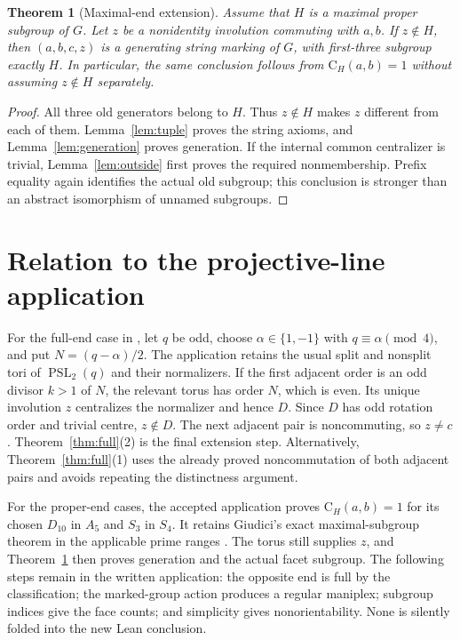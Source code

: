 \documentclass[11pt]{article}
\newtheorem{theorem}{Theorem}
\newcommand{\CG}{\mathrm C}
\begin{document}
\begin{theorem}[Maximal-end extension]\label{thm:maximal}
Assume that $H$ is a maximal proper subgroup of $G$. Let $z$ be a
nonidentity involution commuting with $a,b$. If $z\notin H$, then
$(a,b,c,z)$ is a generating string marking of $G$, with first-three
subgroup exactly $H$. In particular, the same conclusion follows from
$\CG_H(a,b)=1$ without assuming $z\notin H$ separately.
\end{theorem}
\begin{proof}
All three old generators belong to $H$. Thus $z\notin H$ makes $z$
different from each of them. Lemma~\ref{lem:tuple} proves the string
axioms, and Lemma~\ref{lem:generation} proves generation. If the internal
common centralizer is trivial, Lemma~\ref{lem:outside} first proves the
required nonmembership. Prefix equality again identifies the actual
old subgroup; this conclusion is stronger than an abstract isomorphism
of unnamed subgroups.
\end{proof}

\section{Relation to the projective-line application}
For the full-end case in \cite[Section~5]{Application}, let $q$ be odd,
choose $\alpha\in\{1,-1\}$ with $q\equiv\alpha\pmod4$, and put
$N=(q-\alpha)/2$. The application retains the usual split and nonsplit
tori of $\operatorname{PSL}_2(q)$ and their normalizers. If the first
adjacent order is an odd divisor $k>1$ of $N$, the relevant torus has
order $N$, which is even. Its unique involution $z$ centralizes the
normalizer and hence $D$. Since $D$ has odd rotation order and trivial
centre, $z\notin D$. The next adjacent pair is noncommuting, so $z\ne c$.
Theorem~\ref{thm:full}(2) is the final extension step. Alternatively,
Theorem~\ref{thm:full}(1) uses the already proved noncommutation of both
adjacent pairs and avoids repeating the distinctness argument.

For the proper-end cases, the accepted application proves
$\CG_H(a,b)=1$ for its chosen $D_{10}$ in $A_5$ and $S_3$ in $S_4$.
It retains Giudici's exact maximal-subgroup theorem in the applicable
prime ranges \cite[Theorem~2.2(6),(8)]{Giudici}. The torus still supplies
$z$, and Theorem~\ref{thm:maximal} then proves generation and the actual
facet subgroup. The following steps remain in the written application:
the opposite end is full by the classification; the marked-group action
produces a regular maniplex; subgroup indices give the face counts;
and simplicity gives nonorientability. None is silently folded into
the new Lean conclusion.
\end{document}
